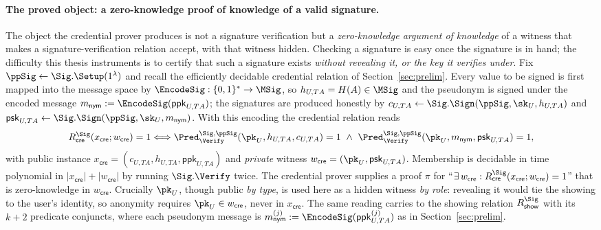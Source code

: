 \paragraph{The proved object: a zero-knowledge proof of knowledge of a valid signature.}
The object the credential prover produces is not a signature verification but a
\emph{zero-knowledge argument of knowledge} of a witness that makes a
signature-verification relation accept, with that witness hidden. Checking a signature is
easy once the signature is in hand; the difficulty this thesis instruments is to certify
that such a signature exists \emph{without revealing it, or the key it verifies under}.
Fix $\ppSig\leftarrow\Sig.\Setup(1^\lambda)$ and recall the efficiently decidable credential
relation of Section~\ref{sec:prelim}. Every value to be signed is first mapped into the
message space by $\EncodeSig:\{0,1\}^{\ast}\to\MSig$, so $h_{U,TA}=H(A)\in\MSig$ and the
pseudonym is signed under the encoded message $m_{\mathsf{nym}}:=\EncodeSig(\mathsf{ppk}_{U,TA})$;
the signatures are produced honestly by
$c_{U,TA}\leftarrow\Sig.\Sign(\ppSig,\sk_U,h_{U,TA})$ and
$\mathsf{psk}_{U,TA}\leftarrow\Sig.\Sign(\ppSig,\sk_U,m_{\mathsf{nym}})$. With this encoding the
credential relation reads
\[
  R_{\mathsf{cre}}^{\Sig}(x_{\mathsf{cre}};w_{\mathsf{cre}})=1
  \Longleftrightarrow
  \Pred_{\Verify}^{\Sig,\ppSig}(\pk_U,h_{U,TA},c_{U,TA})=1
  \ \land\
  \Pred_{\Verify}^{\Sig,\ppSig}(\pk_U,m_{\mathsf{nym}},\mathsf{psk}_{U,TA})=1,
\]
with public instance $x_{\mathsf{cre}}=(c_{U,TA},h_{U,TA},\mathsf{ppk}_{U,TA})$ and \emph{private}
witness $w_{\mathsf{cre}}=(\pk_U,\mathsf{psk}_{U,TA})$. Membership is decidable in time polynomial in
$|x_{\mathsf{cre}}|+|w_{\mathsf{cre}}|$ by running $\Sig.\Verify$ twice. The credential prover supplies
a proof $\pi$ for ``$\exists\,w_{\mathsf{cre}}:R_{\mathsf{cre}}^{\Sig}(x_{\mathsf{cre}};w_{\mathsf{cre}})=1$''
that is zero-knowledge in $w_{\mathsf{cre}}$. Crucially $\pk_U$, though public \emph{by type}, is used here
as a hidden witness \emph{by role}: revealing it would tie the showing to the user's identity,
so anonymity requires $\pk_U\in w_{\mathsf{cre}}$, never in $x_{\mathsf{cre}}$. The same reading
carries to the showing relation $R_{\mathsf{show}}^{\Sig}$ with its $k+2$ predicate conjuncts,
where each pseudonym message is $m_{\mathsf{nym}}^{(j)}:=\EncodeSig(\mathsf{ppk}_{U,TA}^{(j)})$ as in
Section~\ref{sec:prelim}.

